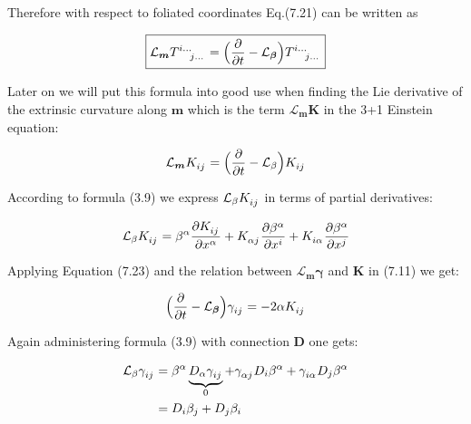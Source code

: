 \documentclass[12pt]{article}
\renewcommand{\vec}[1]{\bm{#1}}
\numberwithin{equation}{section}
\numberwithin{theorem}{subsection}
\begin{document}
Therefore with respect to foliated coordinates Eq.(7.21) can be written as

\begin{equation}

    \boxed{\mathcal{L}_{\vec{m}}\tensor{T}{^i^\dots_j_\dots} = \Big(\frac{\partial}{\partial t} - \mathcal{L}_{\vec{\beta}} \Big) \tensor{T}{^i^\dots_j_\dots}}

\end{equation}

Later on we will put this formula into good use when finding the Lie derivative of the extrinsic curvature along $\vec{m}$ which is the term $\mathcal{L}_{\vec{m}}\vec{K}$ in the 3+1 Einstein equation:

\begin{equation}

    \mathcal{L}_{\vec{m}}\tensor{K}{_i_j} = \Big(\frac{\partial}{\partial t} - \mathcal{L}_{\beta} \Big) \tensor{K}{_i_j}

\end{equation}

According to formula (3.9) we express $\mathcal{L}_{\beta}\tensor{K}{_i_j}$ in terms of partial derivatives:

\begin{equation}

    \mathcal{L}_{\beta}\tensor{K}{_i_j} = \beta^{\alpha}\frac{\partial \tensor{K}{_i_j}

    }{\partial x^{\alpha}} + \tensor{K}{_\alpha_j}\frac{\partial \beta^{\alpha}}{\partial x^{i}} + \tensor{K}{_i_\alpha}\frac{\partial \beta^{\alpha}}{\partial x^{j}}

\end{equation}

Applying Equation (7.23) and the relation between $\mathcal{L}_{\vec{m}}\vec{\gamma}$ and $\vec{K}$ in (7.11) we get:

\begin{equation}

    \Big(\frac{\partial}{\partial t} - \mathcal{L}_{\vec{\beta}} \Big)\tensor{\gamma}{_i_j} = -2\alpha\tensor{K}{_i_j}

\end{equation}

Again administering formula (3.9) with connection $\vec{D}$ one gets:

\begin{align}

    \mathcal{L}_{\beta}\tensor{\gamma}{_i_j} &= \beta^{\alpha}\underbrace{D_{\alpha}\tensor{\gamma}{_i_j}}_{0} + \tensor{\gamma}{_\alpha_j}D_{i}\beta^{\alpha}+\tensor{\gamma}{_i_\alpha}D_{j}\beta^{\alpha} \notag \\

    &= D_{i}\beta_{j} + D_{j}\beta_{i}

\end{align}
\end{document}
